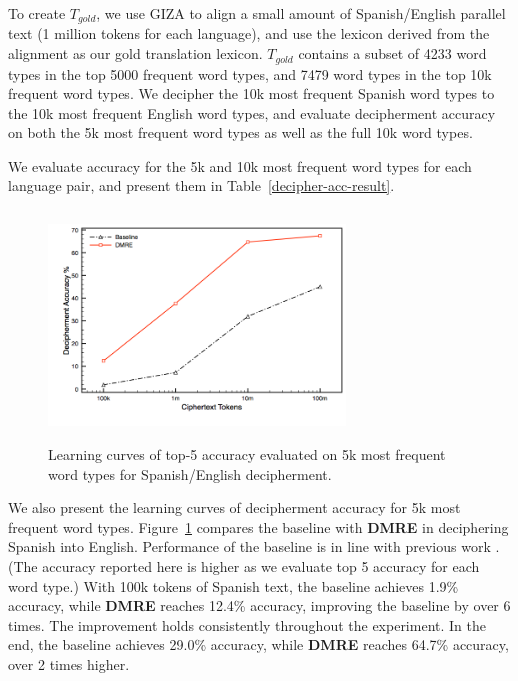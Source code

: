 To create $T_{gold}$, we use GIZA to align a small amount of Spanish/English parallel text (1 million tokens for each language), and use the lexicon derived from the alignment as our gold translation lexicon. $T_{gold}$ contains a subset of 4233 word types in the top 5000 frequent word types, and 7479 word types in the top 10k frequent word types. We decipher the 10k most frequent Spanish word types to the 10k most frequent English word types, and evaluate decipherment accuracy on both the 5k most frequent word types as well as the full 10k word types.

We evaluate accuracy for the 5k and 10k most frequent word types for each language pair, and present them in Table~\ref{decipher-acc-result}.


 \begin{figure}[!ht]
  \centering
  \includegraphics[width=3.1in,height=2.4in]{es_en_curve}
  \caption{Learning curves of top-5 accuracy evaluated on 5k most frequent word types for Spanish/English decipherment.}
\label{es-en-curve}
\end{figure}

We also present the learning curves of decipherment accuracy for 5k most frequent word types. Figure~\ref{es-en-curve} compares the baseline with \textbf{DMRE} in deciphering Spanish into English. Performance of the baseline is in line with previous work \cite{dou-knight:2013:EMNLP}. (The accuracy reported here is higher as we evaluate top 5 accuracy for each word type.) With 100k tokens of Spanish text, the baseline achieves 1.9\% accuracy, while \textbf{DMRE} reaches 12.4\% accuracy, improving the baseline by over 6 times. The improvement holds consistently throughout the experiment. In the end, the baseline achieves 29.0\% accuracy, while \textbf{DMRE} reaches 64.7\% accuracy, over 2 times higher. 

